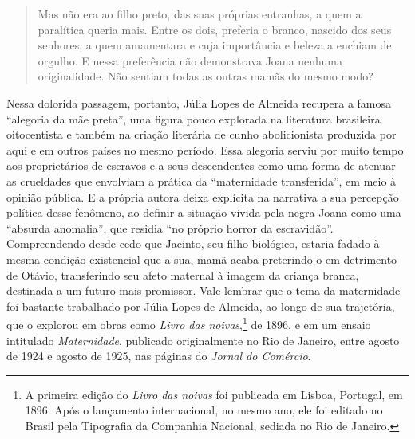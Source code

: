 \begin{quote}


Mas não era ao filho preto, das suas próprias entranhas, a quem a
paralítica queria mais. Entre os dois, preferia o branco, nascido dos
seus senhores, a quem amamentara e cuja importância e beleza a enchiam
de orgulho. E nessa preferência não demonstrava Joana nenhuma
originalidade. Não sentiam todas as outras mamãs do mesmo modo?

\end{quote}
\enlargethispage{\baselineskip}
Nessa dolorida passagem, portanto, Júlia Lopes de Almeida recupera a
famosa ``alegoria da mãe preta'', uma figura pouco explorada na
literatura brasileira oitocentista e também na criação literária de
cunho abolicionista produzida por aqui e em outros países no mesmo
período. Essa alegoria serviu por muito tempo aos proprietários de
escravos e a seus descendentes como uma forma de atenuar as crueldades
que envolviam a prática da ``maternidade transferida'', em meio à
opinião pública. E a própria autora deixa explícita na narrativa a sua
percepção política desse fenômeno, ao definir a situação vivida
pela negra Joana como uma ``absurda anomalia'', que residia ``no próprio
horror da escravidão''. Compreendendo desde cedo que Jacinto, seu filho
biológico, estaria fadado à mesma condição existencial que a sua,
mamã acaba preterindo-o em detrimento de Otávio, transferindo seu
afeto maternal à imagem da criança branca, destinada a um futuro mais
promissor. Vale lembrar que o tema da maternidade foi bastante
trabalhado por Júlia Lopes de Almeida, ao longo de sua trajetória, que o
explorou em obras como \emph{Livro das noivas},\footnote{A primeira
  edição do \emph{Livro das noivas} foi publicada em Lisboa, Portugal,
  em 1896. Após o lançamento internacional, no mesmo ano, ele foi
  editado no Brasil pela Tipografia da Companhia Nacional, sediada no
  Rio de Janeiro.} de 1896, e em um ensaio intitulado
\emph{Maternidade}, publicado originalmente no Rio de Janeiro, entre
agosto de 1924 e agosto de 1925, nas páginas do \emph{Jornal do
Comércio}.

